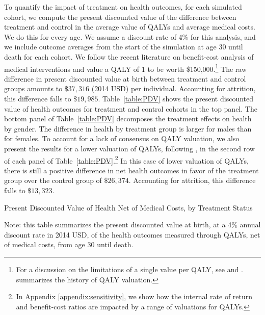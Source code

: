 \noindent To quantify the impact of treatment on health outcomes, for each simulated cohort, we compute the present discounted value of the difference between treatment and control in the average value of QALYs and average medical costs. We do this for every age. We assume a discount rate of 4\% for this analysis, and we include outcome averages from the start of the simulation at age 30 until death for each cohort. We follow the recent literature on benefit-cost analysis of medical interventions and value a QALY of 1 to be worth \$150,000.\footnote{For a discussion on the limitations of a single value per QALY, see \citet{Pinto-Prades_etal_2009_Trying-to-Estimate} and \citet{Mason_etal_2009_Modelling}. \citet{Grosse_2008_Assessing-Cost-Effectiveness} summarizes the history of QALY valuation.} The raw difference in present discounted value at birth between treatment and control groups amounts to $ \$37,316  $ (2014 USD) per individual. Accounting for attrition, this difference falls to $ \$19,985 $. Table~\ref{table:PDV} shows the present discounted value of health outcomes for treatment and control cohorts in the top panel. The bottom panel of Table~\ref{table:PDV} decomposes the treatment effects on health by gender. The difference in health by treatment group is larger for males than for females. To account for a lack of consensus on QALY valuation, we also present the results for a lower valuation of QALYs, following \citet{Cutler_Meara_1998_Med-Costs_BOOK}, in the second row of each panel of Table~\ref{table:PDV}.\footnote{In Appendix \ref{appendix:sensitivity}, we show how the internal rate of return and benefit-cost ratios are impacted by a range of valuations for QALYs.} In this case of lower valuation of QALYs, there is still a positive difference in net health outcomes in favor of the treatment group over the control group of $ \$26,374$. Accounting for attrition, this difference falls to $ \$13,323$. \\

\begin{table}[H]
\begin{threeparttable}
\small
\caption{Present Discounted Value of Health Net of Medical Costs, by Treatment Status} \label{table:PDV}

\begin{tablenotes}
\footnotesize
\item Note: this table summarizes the present discounted value at birth, at a 4\% annual discount rate in 2014 USD, of the health outcomes measured through QALYs, net of medical costs, from age 30 until death. \\
\end{tablenotes}
\end{threeparttable}
\end{table}
